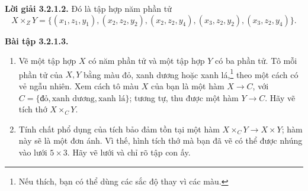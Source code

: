 \noindent\textbf{Lời giải 3.2.1.2.} Đó là tập hợp năm phần tử
\[X\times_ZY=\{(x_1,z_1,y_1),(x_2,z_2,y_2),(x_2,z_2,y_4),(x_3,z_2,y_2),(x_3,z_2,y_4)\}.\]

\noindent\textbf{Bài tập 3.2.1.3.}\keepwithnext
\begin{enumerate}[label=\alph*.]
\item Vẽ một tập hợp $X$ có năm phần tử và một tập hợp $Y$ có ba phần tử. Tô mỗi phần tử của $X,Y$ bằng màu đỏ, xanh dương hoặc xanh lá,\footnote{Nếu thích, bạn có thể dùng các sắc độ thay vì các màu.} theo một cách có vẻ ngẫu nhiên. Xem cách tô màu $X$ của bạn là một hàm $X\to C$, với $C=\{\text{đỏ},\text{xanh dương},\text{xanh lá}\}$; tương tự, thu được một hàm $Y\to C$. Hãy vẽ tích thớ $X\times_CY$.
\item Tính chất phổ dụng của tích bảo đảm tồn tại một hàm $X\times_CY\to X\times Y$; hàm này sẽ là một đơn ánh. Vì thế, hình tích thớ mà bạn đã vẽ có thể được nhúng vào lưới $5\times3$. Hãy vẽ lưới và chỉ rõ tập con ấy.
\end{enumerate}
